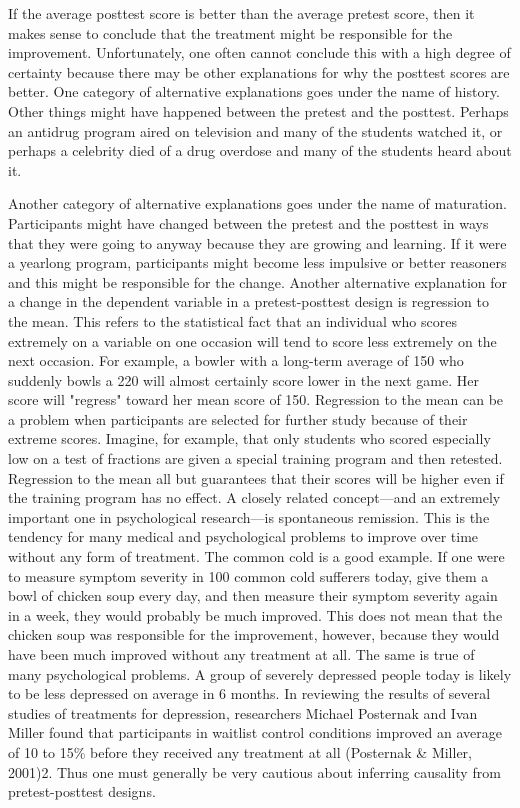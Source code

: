 If the average posttest score is better than the average pretest score, then it makes sense to conclude that the treatment might be responsible for the improvement. Unfortunately, one often cannot conclude this with a high degree of certainty because there may be other explanations for why the posttest scores are better. One category of alternative explanations goes under the name of history. Other things might have happened between the pretest and the posttest. Perhaps an antidrug program aired on television and many of the students watched it, or perhaps a celebrity died of a drug overdose and many of the students heard about it. 

Another category of alternative explanations goes under the name of maturation. Participants might have changed between the pretest and the posttest in ways that they were going to anyway because they are growing and learning. If it were a yearlong program, participants might become less impulsive or better reasoners and this might be responsible for the change.
Another alternative explanation for a change in the dependent variable in a pretest-posttest design is regression to the mean. This refers to the statistical fact that an individual who scores extremely on a variable on one occasion will tend to score less extremely on the next occasion. For example, a bowler with a long-term average of 150 who suddenly bowls a 220 will almost certainly score lower in the next game. Her score will "regress" toward her mean score of 150. Regression to the mean can be a problem when participants are selected for further study because of their extreme scores. Imagine, for example, that only students who scored especially low on a test of fractions are given a special training program and then retested. Regression to the mean all but guarantees that their scores will be higher even if the training program has no effect. A closely related concept---and an extremely important one in psychological research---is spontaneous remission. This is the tendency for many medical and psychological problems to improve over time without any form of treatment. The common cold is a good example. If one were to measure symptom severity in 100 common cold sufferers today, give them a bowl of chicken soup every day, and then measure their symptom severity again in a week, they would probably be much improved. This does not mean that the chicken soup was responsible for the improvement, however, because they would have been much improved without any treatment at all. The same is true of many psychological problems. A group of severely depressed people today is likely to be less depressed on average in 6 months. In reviewing the results of several studies of treatments for depression, researchers Michael Posternak and Ivan Miller found that participants in waitlist control conditions improved an average of 10 to 15\% before they received any treatment at all (Posternak \& Miller, 2001)2. Thus one must generally be very cautious about inferring causality from pretest-posttest designs.

